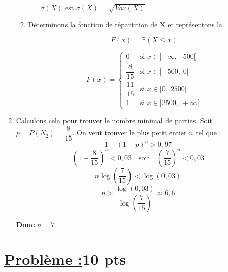 \documentclass[12pt,a4paper]{article}
\begin{document}
\begin{enumerate}
\begin{enumerate}
\begin{itemize}
$\sigma(X)$ est $\sigma(X) = \sqrt{Var(X)}$
    \end{itemize}
    \item Déterminons la fonction de répartition de X et représentons la.

\[
F(x) = \mathbb{P}(X \leq x)
\]

\[
F(x) =
\begin{cases}
0 & \text{si } x \in ]{-\infty}, -500[ \\
\dfrac{8}{15} & \text{si } x \in [-500,\; 0[ \\
\dfrac{11}{15} & \text{si } x \in [0,\; 2500[ \\
1 & \text{si } x \in [2500,\; +\infty[
\end{cases}
\]


\end{enumerate}
\item Calculons cela pour trouver le nombre minimal de parties.
Soit \( p = P(N_2) = \dfrac{8}{15} \). On veut trouver le plus petit entier \( n \) tel que :
\[
1 - (1 - p)^n > 0{,}97
\]
\[
(1 - \dfrac{8}{15})^n < 0{,}03 \quad \text{soit} \quad \left( \dfrac{7}{15} \right)^n < 0{,}03
\]
\[
n \log\left( \dfrac{7}{15} \right) < \log(0{,}03)
\]
\[
n > \dfrac{\log(0{,}03)}{\log\left( \dfrac{7}{15} \right)} \approx 6{,}6
\]

\textbf{Donc } \( n = 7 \)

\end{enumerate}
\section*{\underline{Problème :}\quad\textbf{10 pts}}
\end{document}
